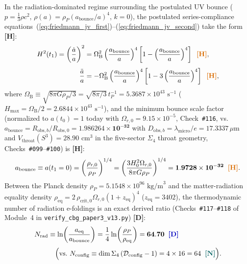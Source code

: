 \documentclass[11pt,a4paper]{article}
\newcommand{\catD}{\textbf{\textcolor{blue!75!black}{[D]}}}
\newcommand{\catH}{\textbf{\textcolor{orange!85!black}{[H]}}}
\newcommand{\catN}{\textbf{\textcolor{teal!75!black}{[N]}}}
\theoremstyle{plain}
\theoremstyle{definition}
\theoremstyle{remark}
\numberwithin{equation}{section}
\begin{document}
In the radiation-dominated regime surrounding the postulated UV bounce ($p = \frac{1}{3}\rho c^2$, $\rho(a) = \rho_P (a_{\text{bounce}}/a)^4$, $k = 0$), the postulated series-compliance equations~(\ref{eq:friedmann_jv_first})--(\ref{eq:friedmann_jv_second}) take the form \catH:
\begin{align}
H^2(t_1) = \left(\frac{\dot{a}}{a}\right)^2 &= \Omega_{\text{B}}^2 \left(\frac{a_{\text{bounce}}}{a}\right)^4 \left[ 1 - \left(\frac{a_{\text{bounce}}}{a}\right)^4 \right] \;\;\catH, \label{eq:exact_bounce_h2} \\[4pt]
\frac{\ddot{a}}{a} &= -\Omega_{\text{B}}^2 \left(\frac{a_{\text{bounce}}}{a}\right)^4 \left[ 1 - 3\left(\frac{a_{\text{bounce}}}{a}\right)^4 \right] \;\;\catH,
\label{eq:exact_bounce_addot}
\end{align}
where $\Omega_{\text{B}} \equiv \sqrt{8\pi G \rho_P / 3} = \sqrt{8\pi / 3}\,t_P^{-1} = 5.3687 \times 10^{43}\text{ s}^{-1}$ ($H_{\max} = \Omega_{\text{B}} / 2 = 2.6844 \times 10^{43}\text{ s}^{-1}$), and the minimum bounce scale factor (normalized to $a(t_0) = 1$ today with $\Omega_{r,0} = 9.15 \times 10^{-5}$, Check~\texttt{\#116}, vs.\ $a_{\text{bounce}} = R_{\text{obs},b}/R_{\text{obs},0} = \mathbf{1.986264 \times 10^{-32}}$ with $D_{\text{obs},b} = \lambda_{\text{micro}}/e = 17.3337\,\mu\text{m}$ and $V_{\text{throat}}(S^3) = 28.90\text{ cm}^3$ in the five-sector $\Sigma_4$ throat geometry, Checks~\texttt{\#099}--\texttt{\#100}) is \catH:
\begin{equation}
a_{\text{bounce}} \equiv a(t_1 = 0) = \left( \frac{\rho_{r,0}}{\rho_P} \right)^{1/4} = \left( \frac{3 H_0^2 \Omega_{r,0}}{8\pi G \rho_P} \right)^{1/4} = \mathbf{1.9728 \times 10^{-32}} \;\;\catH.
\label{eq:a_bounce_numerical}
\end{equation}
Between the Planck density $\rho_P = 5.1548 \times 10^{96}\text{ kg/m}^3$ and the matter-radiation equality density $\rho_{\text{eq}} = 2\,\rho_{\text{crit},0}\Omega_{r,0}(1 + z_{\text{eq}})^4$ ($z_{\text{eq}} = 3402$), the thermodynamic number of radiation e-foldings is an exact derived ratio (Checks~\texttt{\#117}--\texttt{\#118} of Module~4 in \allowbreak\texttt{verify\_cbg\_paper3\_v13.py}) \catD:
\begin{align}
N_{\text{rad}} &\equiv \ln\!\left(\frac{a_{\text{eq}}}{a_{\text{bounce}}}\right) = \frac{1}{4}\ln\!\left(\frac{\rho_P}{\rho_{\text{eq}}}\right) = \mathbf{64.70} \;\;\catD \nonumber \\[3pt]
&\quad \Bigl(\text{vs.\ } N_{\text{config}} \equiv \dim\Sigma_4\left(\mathcal{D}_{\text{config}}-1\right) = 4 \times 16 = 64 \;\;\catN\Bigr).
\label{eq:exact_n_rad_efoldings}
\end{align}
\end{document}
